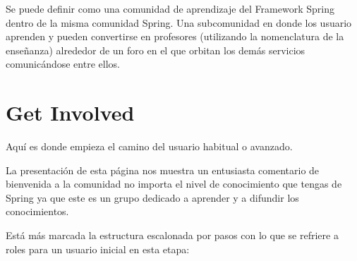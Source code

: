 \documentclass[11pt]{scrartcl}
\begin{document}
Se puede definir como una comunidad de aprendizaje del Framework Spring dentro de la misma comunidad Spring. Una subcomunidad en donde los usuario aprenden y pueden convertirse en profesores (utilizando la nomenclatura de la ense\~nanza) alrededor de un foro en el que orbitan los dem\'as servicios comunic\'andose entre ellos.

\section{Get Involved}

Aqu\'i es donde empieza el camino del usuario habitual o avanzado.

La presentaci\'on de esta p\'agina nos muestra un entusiasta comentario de bienvenida a la comunidad no importa el nivel de conocimiento que tengas de Spring ya que este es un grupo dedicado a aprender y a difundir los conocimientos.

Est\'a m\'as marcada la estructura escalonada por pasos con lo que se refriere a roles para un usuario inicial en esta etapa:
\end{document}
